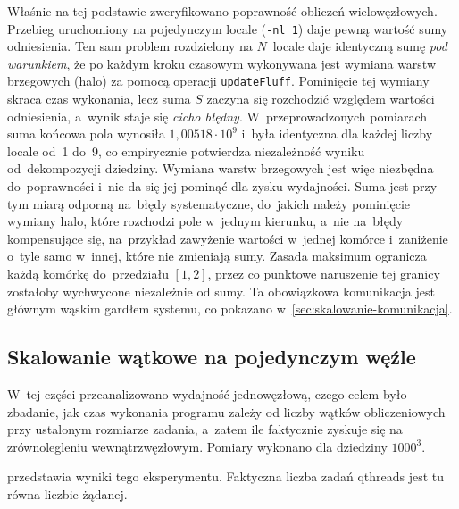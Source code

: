 Właśnie na tej podstawie zweryfikowano poprawność obliczeń wielowęzłowych.
Przebieg uruchomiony na pojedynczym locale (\texttt{-nl 1}) daje pewną wartość
sumy odniesienia. Ten sam problem rozdzielony na $N$~locale daje identyczną
sumę \emph{pod warunkiem}, że po każdym kroku czasowym wykonywana jest
wymiana warstw brzegowych (halo) za pomocą operacji \texttt{updateFluff}.
Pominięcie tej wymiany skraca czas wykonania, lecz suma $S$ zaczyna się
rozchodzić względem wartości odniesienia, a~wynik staje się \emph{cicho błędny}.
W~przeprowadzonych pomiarach suma końcowa pola
wynosiła $1{,}00518\cdot 10^{9}$ i~była identyczna dla każdej liczby locale od~1 do~9, co empirycznie potwierdza niezależność
wyniku od~dekompozycji dziedziny.
Wymiana warstw brzegowych
jest więc niezbędna do~poprawności i~nie da się jej pominąć dla zysku
wydajności. Suma jest przy tym
miarą odporną na~błędy systematyczne, do~jakich należy pominięcie wymiany halo,
które rozchodzi pole w~jednym kierunku, a~nie na~błędy kompensujące się, na~przykład
zawyżenie wartości w~jednej komórce i~zaniżenie o~tyle samo w~innej, które nie zmieniają sumy.
Zasada maksimum ogranicza każdą komórkę do~przedziału $[1,2]$, przez co punktowe
naruszenie tej granicy zostałoby wychwycone niezależnie od sumy. Ta obowiązkowa
komunikacja jest głównym wąskim
gardłem systemu, co pokazano w~\cref{sec:skalowanie-komunikacja}.


\subsection{Skalowanie wątkowe na pojedynczym węźle}
\label{subsec:skalowanie-watkowe}

W~tej części przeanalizowano wydajność jednowęzłową, czego celem
było zbadanie, jak czas wykonania programu zależy od liczby wątków obliczeniowych
przy ustalonym rozmiarze zadania, a~zatem ile faktycznie zyskuje się na
zrównolegleniu wewnątrzwęzłowym. Pomiary wykonano dla dziedziny $1000^3$.

 przedstawia wyniki tego eksperymentu. Faktyczna liczba
zadań qthreads jest tu równa liczbie żądanej.

